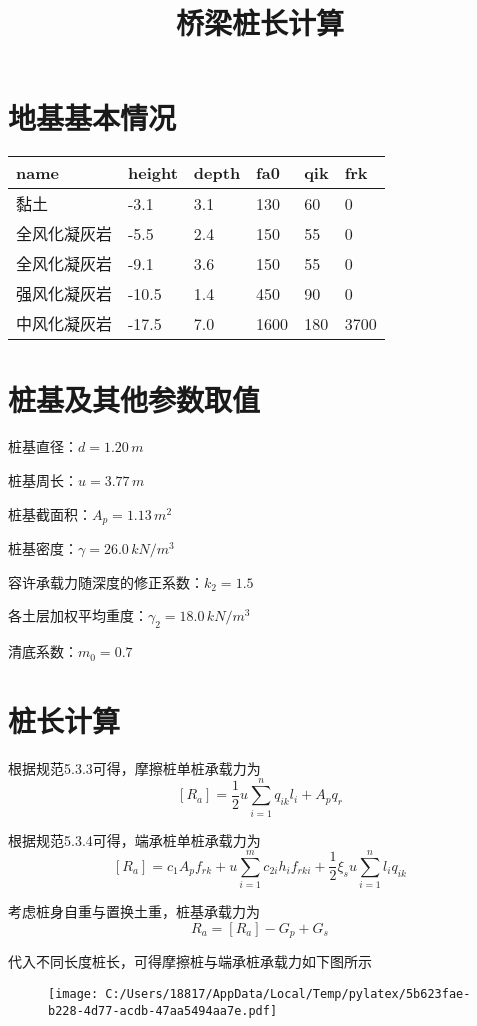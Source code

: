\documentclass[cs4size, UTF8]{ctexart}%
\title{\heiti 桥梁桩长计算}%
\author{}%
\date{}%
\begin{document}
%
\normalsize%
\maketitle%
\section{地基基本情况}%
\label{sec:}%
\begin{longtabu}{p{4cm}XXXXX}%
\hline%
\textbf{name}&\textbf{height}&\textbf{depth}&\textbf{fa0}&\textbf{qik}&\textbf{frk}\\%
\hline%
黏土&{-}3.1&3.1&130&60&0\\%
全风化凝灰岩&{-}5.5&2.4&150&55&0\\%
全风化凝灰岩&{-}9.1&3.6&150&55&0\\%
强风化凝灰岩&{-}10.5&1.4&450&90&0\\%
中风化凝灰岩&{-}17.5&7.0&1600&180&3700\\%
\hline%
\end{longtabu}

%
\section{桩基及其他参数取值}%
\label{sec:}%
桩基直径：$d=1.20\,m$

        桩基周长：$u=3.77\,m$

        桩基截面积：$A_p=1.13\,m^2$

        桩基密度：$\gamma=26.0\,kN/m^3$

        容许承载力随深度的修正系数：$k_2=1.5$

        各土层加权平均重度：$\gamma_2=18.0\,kN/m^3$

        清底系数：$m_0=0.7$
        

%
\section{桩长计算}%
\label{sec:}%
根据规范5.3.3可得，摩擦桩单桩承载力为%
\[%
[R_a] =\frac{1}{2}u\sum_{i=1}^nq_{ik}l_i+A_pq_r%
\]%

%
根据规范5.3.4可得，端承桩单桩承载力为%
\[%
[R_a]= c_1A_pf_{rk} +u\sum_{i=1}^mc_{2i}h_if_{rki} +\frac{1}{2}\xi_su\sum_{i=1}^nl_iq_{ik}%
\]%

%
考虑桩身自重与置换土重，桩基承载力为%
\[%
R_a =[R_a]-G_p+G_s%
\]%

%
代入不同长度桩长，可得摩擦桩与端承桩承载力如下图所示%


\begin{figure}[htbp]%
\centering%
\texttt{[image: C:/Users/18817/AppData/Local/Temp/pylatex/5b623fae-b228-4d77-acdb-47aa5494aa7e.pdf]}%
\end{figure}
\end{document}
